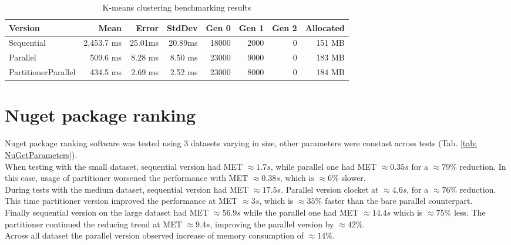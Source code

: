 \begin{table}[ht]%
    \centering
    \caption{K-means clustering benchmarking results}
		\label{tab: KMeansBenchmarking}
    \begin{tabularx}{\linewidth}{Xrrrrrrr} \toprule
			\bfseries Version 	&
			\bfseries Mean    	&
			\bfseries Error	    &
			\bfseries StdDev	  &
			\bfseries Gen 0	    &
			\bfseries Gen 1	    &
			\bfseries Gen 2	    &
			\bfseries Allocated \\ 
			\midrule 
Sequential & 2,453.7 ms	& 25.01ms	& 20.89ms	& 18000 & 	2000 & 	0 & 151 MB \\
Parallel & 509.6 ms	& 8.28 ms	& 8.50 ms	& 23000 & 	9000 & 	0 & 183 MB \\ 
PartitionerParallel & 434.5 ms	& 2.69 ms	& 2.52 ms	& 23000 & 	8000 & 	0 & 184 MB \\
			\bottomrule
		\end{tabularx}
\end{table}
		
\clearpage
\section{Nuget package ranking}
Nuget package ranking software was tested using 3 datasets varying in size, other parameters were constast across tests (Tab. \ref{tab: NuGetParameters}). \\
When testing with the small dataset, sequential version had MET $\approx 1.7s$, while parallel one had MET $\approx 0.35s$ for a $\approx 79\%$ reduction. In this case, usage of partitioner worsened the performance with MET  $\approx 0.38s$, which is $\approx 6\%$ slower. \\ 
During tests with the medium dataset, sequential version had MET $\approx 17.5s$. Parallel version clocket at $\approx 4.6s$, for a $\approx 76\%$ reduction. This time partitioner version improved the performance at MET $\approx 3s$, which is $\approx 35\%$ faster than the bare parallel counterpart. \\ 
Finally sequential version on the large dataset had MET $\approx 56.9s$ while the parallel one had MET $\approx 14.4s$ which is $\approx 75\%$ less.
The partitioner continued the reducing trend at MET $\approx 9.4s$, improving the parallel version by $\approx 42 \%$. \\
Across all dataset the parallel version observed increase of memory consumption of $\approx 14\%$.

